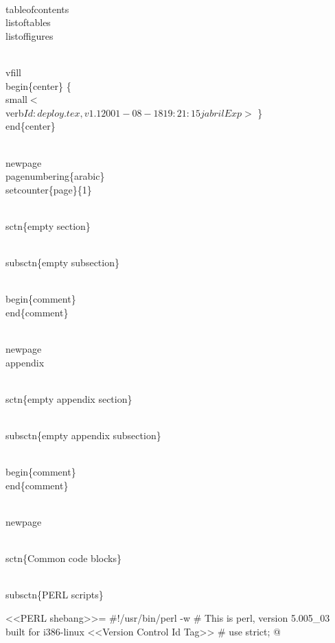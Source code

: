 \documentclass[11pt]{article}
\newcommand{\sctn}[1]{\section{#1}}
\newcommand{\subsctn}[1]{\subsection{#1}}
\begin{document}
\\tableofcontents
\\listoftables
\\listoffigures

\\vfill
\\begin\{center\}
\{\\small$<$ \\verb$Id: deploy.tex,v 1.1 2001-08-18 19:21:15 jabril Exp $$>$ \}
\\end\{center\}


\\newpage
\\pagenumbering\{arabic\}
\\setcounter\{page\}\{1\}

\\sctn\{empty section\}

\\subsctn\{empty subsection\}

\\begin\{comment\}
\\end\{comment\}


% 

\\newpage
\\appendix

\\sctn\{empty appendix section\}

\\subsctn\{empty appendix subsection\}

\\begin\{comment\}
\\end\{comment\}

\\newpage

\\sctn\{Common code blocks\}

\\subsctn\{PERL scripts\}

<<PERL shebang>>=
#!/usr/bin/perl -w
# This is perl, version 5.005_03 built for i386-linux
<<Version Control Id Tag>>
#
use strict;
@
\end{document}
